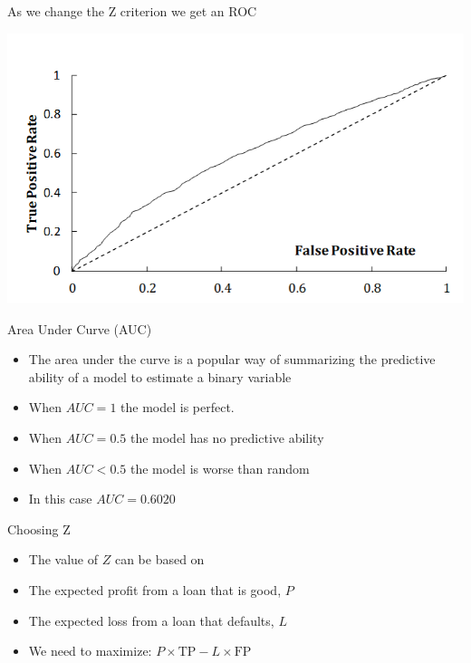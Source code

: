 \documentclass[11pt]{beamer}
\begin{document}
\begin{frame}{As we change the Z criterion we get an ROC}
	 
	\begin{center}
	\includegraphics[scale=0.5]{../05-pictures/lesson-3-1_pic_15.png}
	\end{center}
\end{frame}
\begin{frame}{Area Under Curve (AUC)}
	\begin{itemize}
		\item The area under the curve is a popular way of summarizing the predictive ability of a model to estimate a binary variable
		\item When $AUC =1$ the model is perfect. 
		\item When $AUC =0.5$ the model has no predictive ability
		\item When $AUC<0.5$ the model is worse than random
		\item In this case $AUC = 0.6020$
	\end{itemize}
\end{frame}
\begin{frame}{Choosing Z}
	\begin{itemize}
		\item The value of $Z$ can be based on 
		\item The expected profit from a loan that is good, $P$
		\item The expected loss from a loan that defaults, $L$
		\item We need to maximize: $P \times \text{TP}-L \times \text{FP}$
	\end{itemize}
\end{frame}
\end{document}
